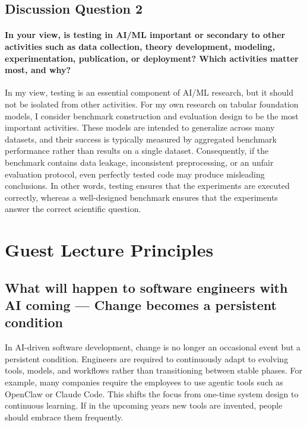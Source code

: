\documentclass[11pt]{article}
\begin{document}
\subsection{Discussion Question 2}

\paragraph{In your view, is testing in AI/ML important or secondary to other activities such as data collection, theory development, modeling, experimentation, publication, or deployment? Which activities matter most, and why?}

In my view, testing is an essential component of AI/ML research, but it should not be isolated from other activities. For my own research on tabular foundation models, I consider benchmark construction and evaluation design to be the most important activities. These models are intended to generalize across many datasets, and their success is typically measured by aggregated benchmark performance rather than results on a single dataset. Consequently, if the benchmark contains data leakage, inconsistent preprocessing, or an unfair evaluation protocol, even perfectly tested code may produce misleading conclusions. In other words, testing ensures that the experiments are executed correctly, whereas a well-designed benchmark ensures that the experiments answer the correct scientific question.

\section{Guest Lecture Principles}
\subsection{What will happen to software engineers with AI coming --- Change becomes a persistent condition}

In AI-driven software development, change is no longer an occasional event but a persistent condition. Engineers are required to continuously adapt to evolving tools, models, and workflows rather than transitioning between stable phases. For example, many companies require the employees to use agentic tools such as OpenClaw or Claude Code.   This shifts the focus from one-time system design to continuous learning. If in the upcoming years new tools are invented, people should embrace them frequently. 
\end{document}
